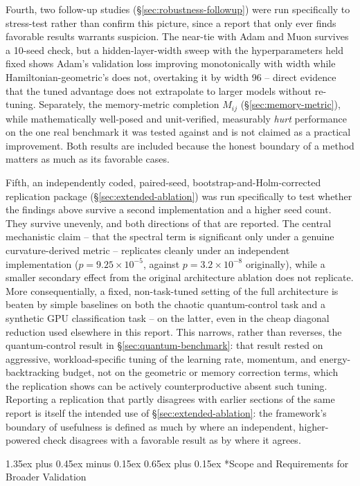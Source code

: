 \documentclass[10pt,twocolumn]{article}
\makeatletter
\renewcommand\section{\@startsection{section}{1}{0pt}%
  {1.35ex plus 0.45ex minus 0.15ex}%
  {0.65ex plus 0.15ex}%
  {\large\bfseries}}
\makeatother
\begin{document}
Fourth, two follow-up studies (\S\ref{sec:robustness-followup}) were run
specifically to stress-test rather than confirm this picture, since a report
that only ever finds favorable results warrants suspicion. The near-tie with
Adam and Muon survives a 10-seed check, but a hidden-layer-width sweep with
the hyperparameters held fixed shows Adam's validation loss improving
monotonically with width while Hamiltonian-geometric's does not, overtaking
it by width 96 -- direct evidence that the tuned advantage does not
extrapolate to larger models without re-tuning. Separately, the memory-metric
completion $M_{ij}$ (\S\ref{sec:memory-metric}), while mathematically
well-posed and unit-verified, measurably \emph{hurt} performance on the one
real benchmark it was tested against and is not claimed as a practical
improvement. Both results are included because the honest boundary of a
method matters as much as its favorable cases.

Fifth, an independently coded, paired-seed, bootstrap-and-Holm-corrected
replication package (\S\ref{sec:extended-ablation}) was run specifically to
test whether the findings above survive a second implementation and a
higher seed count. They survive unevenly, and both directions of that are
reported. The central mechanistic claim -- that the spectral term is
significant only under a genuine curvature-derived metric -- replicates
cleanly under an independent implementation ($p=9.25\times10^{-5}$, against
$p=3.2\times10^{-8}$ originally), while a smaller secondary effect from the
original architecture ablation does not replicate. More consequentially, a
fixed, non-task-tuned setting of the full architecture is beaten by simple
baselines on both the chaotic quantum-control task and a synthetic GPU
classification task -- on the latter, even in the cheap diagonal reduction
used elsewhere in this report. This narrows, rather than reverses, the
quantum-control result in \S\ref{sec:quantum-benchmark}: that result rested
on aggressive, workload-specific tuning of the learning rate, momentum, and
energy-backtracking budget, not on the geometric or memory correction terms,
which the replication shows can be actively counterproductive absent such
tuning. Reporting a replication that partly disagrees with earlier sections
of the same report is itself the intended use of \S\ref{sec:extended-ablation}:
the framework's boundary of usefulness is defined as much by where an
independent, higher-powered check disagrees with a favorable result as by
where it agrees.

\section*{Scope and Requirements for Broader Validation}
\label{sec:positioning}
\end{document}
